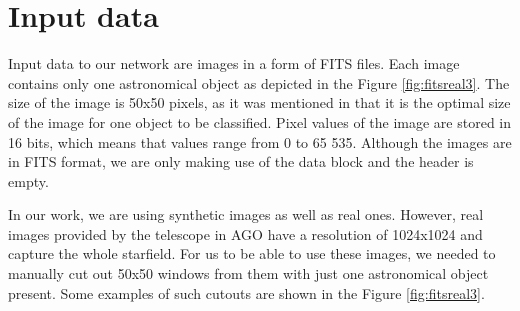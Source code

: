 \section{Input data} \label{sec:inputdata}

Input data to our network are images in a form of FITS files. Each image contains only one astronomical object as depicted in the Figure \ref{fig:fitsreal3}. The size of the image is 50x50 pixels, as it was mentioned in \cite{Andreon2000} that it is the optimal size of the image for one object to be classified. 
Pixel values of the image are stored in 16 bits, which means that values range from 0 to 65 535. Although the images are in FITS format, we are only making use of the data block and the header is empty. 

In our work, we are using synthetic images as well as real ones. 
However, real images provided by the telescope in AGO have a resolution of 1024x1024 and capture the whole starfield. For us to be able to use these images, we needed to manually cut out 50x50 windows from them with just one astronomical object present. Some examples of such cutouts are shown in the Figure \ref{fig:fitsreal3}.  


